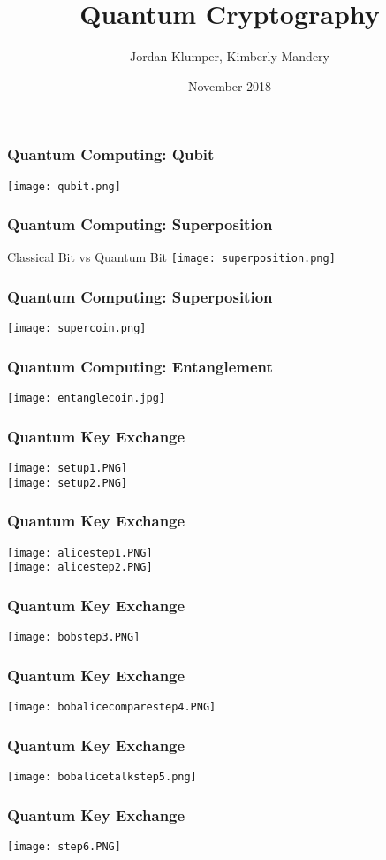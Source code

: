 \documentclass{beamer}
\title[Quantum Cryptography]{Quantum Cryptography}
\author{Jordan Klumper, Kimberly Mandery}
\institute{MATH5347: Cryptography}
\date{November 2018}
\begin{document}
\frame{\titlepage}
 
\begin{frame}
\frametitle{Quantum Computing: Qubit}
\begin{center}
\texttt{[image: qubit.png]}
\end{center}
\end{frame}
\begin{frame}
\frametitle{Quantum Computing: Superposition}
\begin{center}
Classical Bit vs Quantum Bit
\texttt{[image: superposition.png]}
\end{center}
\end{frame}

\begin{frame}
\frametitle{Quantum Computing: Superposition}
\begin{center}
\texttt{[image: supercoin.png]}
\end{center}
\end{frame}

\begin{frame}
\frametitle{Quantum Computing: Entanglement}
\begin{center}
\texttt{[image: entanglecoin.jpg]}
\end{center}
\end{frame}

\begin{frame}
\frametitle{Quantum Key Exchange}
\centering
\texttt{[image: setup1.PNG]}\\
\texttt{[image: setup2.PNG]}
\end{frame}
\begin{frame}
\frametitle{Quantum Key Exchange}
\centering
\texttt{[image: alicestep1.PNG]}\\ 
\texttt{[image: alicestep2.PNG]}
\end{frame}
\begin{frame}
\frametitle{Quantum Key Exchange}
\centering
\texttt{[image: bobstep3.PNG]}
\end{frame}
\begin{frame}
\frametitle{Quantum Key Exchange}
\centering
\texttt{[image: bobalicecomparestep4.PNG]}
\end{frame}
\begin{frame}
\frametitle{Quantum Key Exchange}
\centering
\texttt{[image: bobalicetalkstep5.png]}
\end{frame}
\begin{frame}
\frametitle{Quantum Key Exchange}
\centering
\texttt{[image: step6.PNG]}\\
\href{https://www.youtube.com/watch?v=zL4HSk4MUUw}{}
\end{frame}
\end{document}
